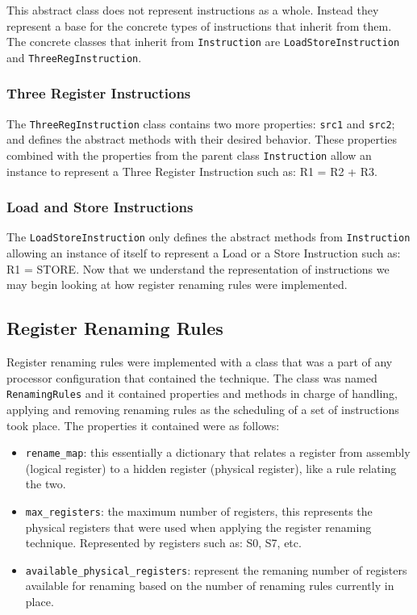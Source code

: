 \documentclass{article}
\begin{document}
This abstract class does not represent instructions as a whole. Instead they represent a base for the concrete types of instructions that inherit from them. The concrete classes that inherit from \lstinline|Instruction| are \lstinline|LoadStoreInstruction| and \lstinline|ThreeRegInstruction|.
\subsubsection{Three Register Instructions}
The \lstinline|ThreeRegInstruction| class contains two more properties: \lstinline|src1| and \lstinline|src2|; and defines the abstract methods with their desired behavior. These properties combined with the properties from the parent class \lstinline|Instruction| allow an instance to represent a Three Register Instruction such as: R1 = R2 + R3.

\subsubsection{Load and Store Instructions}
The \lstinline|LoadStoreInstruction| only defines the abstract methods from \lstinline|Instruction| allowing an instance of itself to represent a Load or a Store Instruction such as: R1 = STORE. Now that we understand the representation of instructions we may begin looking at how register renaming rules were implemented. 

\subsection{Register Renaming Rules}
Register renaming rules were implemented with a class that was a part of any processor configuration that contained the technique. The class was named \lstinline|RenamingRules| and it contained properties and methods in charge of handling, applying and removing renaming rules as the scheduling of a set of instructions took place. The properties it contained were as follows:

\begin{itemize}
    \item \lstinline|rename_map|: this essentially a dictionary that relates a register from assembly (logical register) to a hidden register (physical register), like a rule relating the two. 
    \item \lstinline|max_registers|: the maximum number of registers, this represents the physical registers that were used when applying the register renaming technique. Represented by registers such as: S0, S7, etc.
    \item \lstinline|available_physical_registers|: represent the remaning number of registers available for renaming based on the number of renaming rules currently in place. 
\end{itemize}
\end{document}
